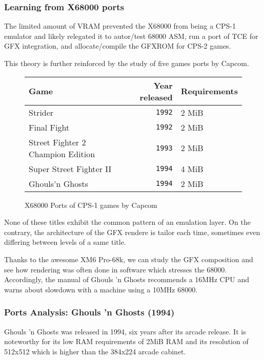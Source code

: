 \subsubsection{Learning from X68000 ports}

The limited amount of VRAM prevented the X68000 from being a CPS-1 emulator and likely relegated it to autor/test 68000 ASM, run a port of TCE for GFX integration, and allocate/compile the GFXROM for CPS-2 games. 

This theory is further reinforced by the study of five games ports by Capcom.

\begin{figure}[H]

\begin{tabularx}{\textwidth}{lrY}
  \toprule    
  \textbf{Game } & \textbf{ Year released}  & \textbf{Requirements } \\               
  \toprule   
  Strider & \texttt{1992} &  2 MiB \\
  Final Fight & \texttt{1992} &  2 MiB \\
  Street Fighter 2 Champion Edition & \texttt{1993} &  2 MiB \\
  Super Street Fighter II & \texttt{1994} &  4 MiB \\
  Ghouls'n Ghosts & \texttt{1994} &  2 MiB \\
    \toprule   
\end{tabularx}
\caption*{X68000 Ports of CPS-1 games by Capcom}
\end{figure}

None of these titles exhibit the common pattern of an emulation layer. On the contrary, the architecture of the GFX rendere is tailor each time, sometimes even differing between levels of a same title. 

Thanks to the awesome XM6 Pro-68k, we can study the GFX composition\cite{x68k_games_analysis} and see how rendering was often done in software which stresses the 68000. Accordingly, the manual of Ghouls 'n Ghosts recommends a 16MHz CPU and warns about slowdown with a machine using a 10MHz 68000.



\subsubsection{Ports Analysis: Ghouls 'n Ghosts (1994)}
Ghouls 'n Ghosts was released in 1994, six years after its arcade release. It is noteworthy for its low RAM requirements of 2MiB RAM and its resolution of 512x512 which is higher than the 384x224 arcade cabinet. 

